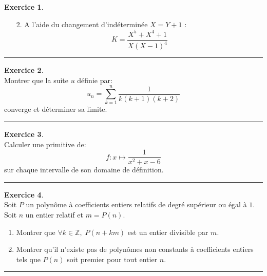 \documentclass[a4paper,10pt]{article}
\theoremstyle{definition}
\theoremstyle{definition}
\newtheorem{exo}{Exercice}
\newcommand{\Z}{\mathbb{Z}}
\begin{document}
\begin{minipage}{1\linewidth}
\begin{minipage}[t]{0.48\linewidth}
\begin{exo}
\end{exo}


\end{minipage}	
\hfill\vrule\hfill
\begin{minipage}[t]{0.48\linewidth}
\raggedright

\begin{enumerate}
\item[2.] A l'aide du changement d'indéterminée $X=Y+1$ :
$$K=\frac{X^5+X^4+1}{X(X-1)^4}$$
\end{enumerate}
\centering
\rule{1\linewidth}{0.6pt}
\begin{exo}\quad\\
Montrer que la suite $u$ définie par:
$$u_n = \sum_{k=1}^{n}\dfrac{1}{k(k+1)(k+2)}$$ 
converge et déterminer sa limite.

\centering\rule{1\linewidth}{0.6pt}
\end{exo}

\begin{exo}\quad\\
Calculer une primitive de: 
$$f: x \longmapsto  \dfrac{1}{x^2+x-6}$$
sur chaque intervalle de son domaine de définition.

\centering\rule{1\linewidth}{0.6pt}
\end{exo}

\begin{exo}\quad\\
Soit $P$ un polynôme à coefficients entiers relatifs de degré supérieur ou égal à $1$. Soit $n$ un entier relatif 
et $m=P(n)$.
\begin{enumerate}
\item  Montrer que $\forall k\in\Z,\;P(n+km)$ est un entier divisible par $m$.
\item  Montrer qu'il n'existe pas de polynômes non constants à coefficients entiers tels que $P(n)$ soit premier pour tout entier $n$.
\end{enumerate}
\centering\rule{1\linewidth}{0.6pt}
\end{exo}
\end{minipage}
\end{minipage}

\newpage
\end{document}
